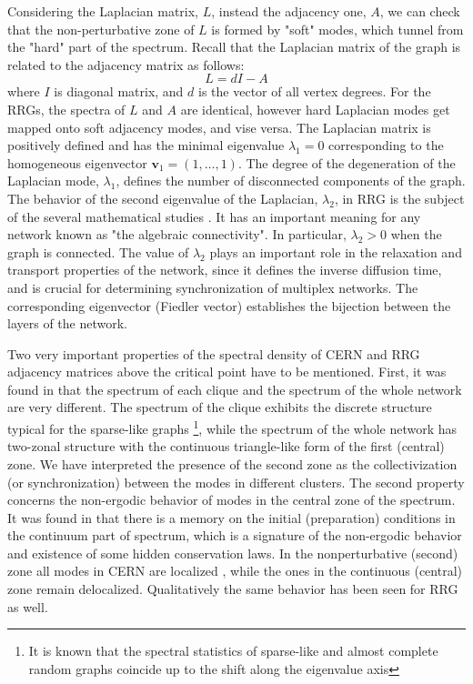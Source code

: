 \documentclass[aps,12pt]{revtex4}
\newcommand{\be}{\begin{equation}}
\newcommand{\ee}{\end{equation}}
\begin{document}
Considering the Laplacian matrix, $L$, instead the adjacency one, $A$, we can check that the non-perturbative zone of $L$ is formed by "soft" modes, which tunnel from the "hard" part of the spectrum. Recall that the Laplacian matrix of the graph is related to the adjacency matrix as follows:
\be
L= d I - A
\ee
where $I$ is  diagonal matrix, and $d$ is the vector of all vertex degrees. For the RRGs, the spectra of $L$ and $A$ are identical, however hard Laplacian modes get mapped onto soft adjacency modes, and vise versa. The Laplacian matrix is positively defined and has the minimal eigenvalue $\lambda_1=0$ corresponding to the homogeneous eigenvector  $\mathbf{v}_1=(1,\dots,1)$. The degree of the degeneration of the Laplacian mode, $\lambda_1$, defines the number of disconnected components of the graph. The behavior of the second eigenvalue of the Laplacian, $\lambda_2$, in RRG is the subject of the several mathematical studies \cite{second}. It has an important meaning for any network known as "the algebraic connectivity". In particular, $\lambda_2>0$ when the graph is connected. The value of $\lambda_2$ plays an important role in the relaxation and transport properties of the network, since it defines the inverse diffusion time, and is crucial for determining synchronization of multiplex networks. The corresponding eigenvector (Fiedler vector) establishes the bijection between the layers of the network.

Two very important properties of the spectral density of CERN and RRG adjacency matrices above the critical point have to be mentioned. First, it was found in \cite{decay} that the spectrum of each clique and the spectrum of the whole network are very different. The spectrum of the clique exhibits the discrete structure typical for the sparse-like graphs \footnote{It is known \cite{tao} that the spectral statistics of sparse-like and almost complete random graphs coincide up to the shift along the eigenvalue axis}, while the spectrum of the whole network has two-zonal structure with the continuous triangle-like form of the first (central) zone. We have interpreted the presence of the second zone as the collectivization (or synchronization) between the modes in different clusters. The second property concerns the non-ergodic behavior of modes in the central zone of the spectrum. It was found in \cite{anderson} that there is a memory on the initial (preparation) conditions in the continuum part of spectrum, which is a signature of the non-ergodic behavior and existence of some hidden conservation laws. In the nonperturbative (second) zone all modes in CERN are localized \cite{anderson}, while the ones in the continuous (central) zone remain delocalized. Qualitatively the same behavior has been seen for RRG as well.
\end{document}

